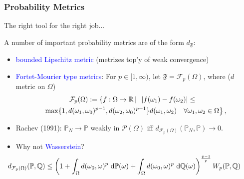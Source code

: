 \documentclass[aspectratio=169,xcolor=dvipsnames,10pt]{beamer}
\begin{document}
\begin{frame}\frametitle{Probability Metrics}
\begin{exampleblock}{}
\centering
The right tool for the right job...
\end{exampleblock}

\begin{exampleblock}{}
A number of important probability metrics are of the form $d_{\mathfrak F}$:
\begin{itemize}
\item \textcolor{Blue}{bounded Lipschitz metric} (metrizes top'y of weak convergence) 
\item \textcolor{Blue}{Fortet-Mourier type metrics}: \pause For $p \in [1,\infty)$, let $\mathfrak F = \mathcal{F}_p(\Omega)$, where ($d$ metric on $\Omega$)
\begin{multline*}
\hspace{-2ex}\mathcal{F}_{p}(\Omega) := \left\{ f : \Omega \to \mathbb R \left|\;\right.\right. 
| f(\omega_1) - f(\omega_2)| \le\\ \left.\max\{1,d(\omega_1,\omega_0)^{p-1}, d(\omega_2,\omega_0)^{p-1}\}d(\omega_1,\omega_2) \quad \forall \omega_1,\omega_2 \in \Omega \right\},
\end{multline*}
\item \pause Rachev (1991): $\mathbb P_N \to \mathbb P$ weakly in $\mathcal{P}(\Omega)$ iff $d_{\mathcal{F}_p(\Omega)}(\mathbb P_N,\mathbb P) \to 0$. \pause
\item Why not \textcolor{Blue}{Wasserstein}? \vspace{-2ex}
\[
\hspace{-7.5ex}d_{\mathcal{F}_p(\Omega)}(\mathbb P,\mathbb Q) 
\le \left(1 + \int_{\Omega} d(\omega_0,\omega)^p \ \mathrm{d} \mathbb P(\omega) + \int_{\Omega} d(\omega_0,\omega)^p \ \mathrm{d}\mathbb Q(\omega)\right)^{\frac{p-1}{p}} W_p(\mathbb P,\mathbb Q)
\]
\end{itemize}
\end{exampleblock}
\end{frame}
\end{document}
